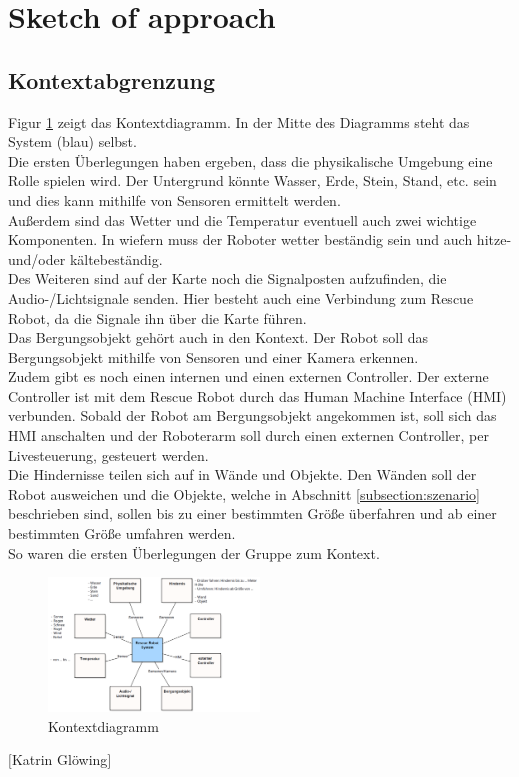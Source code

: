 \section{Sketch of approach}

\subsection{Kontextabgrenzung}
Figur \ref{fig:Kontext} zeigt das Kontextdiagramm. In der Mitte des Diagramms steht das System (blau) selbst.\\
Die ersten Überlegungen haben ergeben, dass die physikalische Umgebung eine Rolle spielen wird. Der Untergrund könnte Wasser, Erde, Stein, Stand, etc. sein und dies kann mithilfe von Sensoren ermittelt werden.\\
Außerdem sind das Wetter und die Temperatur eventuell auch zwei wichtige Komponenten. In wiefern muss der Roboter wetter beständig sein und auch hitze- und/oder kältebeständig.\\
Des Weiteren sind auf der Karte noch die Signalposten aufzufinden, die Audio-/Lichtsignale senden. Hier besteht auch eine Verbindung zum Rescue Robot, da die Signale ihn über die Karte führen.\\
Das Bergungsobjekt gehört auch in den Kontext. Der Robot soll das Bergungsobjekt mithilfe von Sensoren und einer Kamera erkennen.\\
Zudem gibt es noch einen internen und einen externen Controller. Der externe Controller ist mit dem Rescue Robot durch das Human Machine Interface (HMI) verbunden. Sobald der Robot am Bergungsobjekt angekommen ist, soll sich das HMI anschalten und der Roboterarm soll durch einen externen Controller, per Livesteuerung, gesteuert werden.\\
Die Hindernisse teilen sich auf in Wände und Objekte. Den Wänden soll der Robot ausweichen und die Objekte, welche in Abschnitt \ref{subsection:szenario} beschrieben sind, sollen bis zu einer bestimmten Größe überfahren und ab einer bestimmten Größe umfahren werden.\\
So waren die ersten Überlegungen der Gruppe zum Kontext.
\begin{figure}[htbp] 
  \centering
     \includegraphics[width=0.5\textwidth]{Bilder/Kontextdiagramm.PNG}
  \caption{Kontextdiagramm}
  \label{fig:Kontext}
\end{figure}
\begin{flushright}
	$ [ $Katrin Glöwing$ ] $
\end{flushright}
